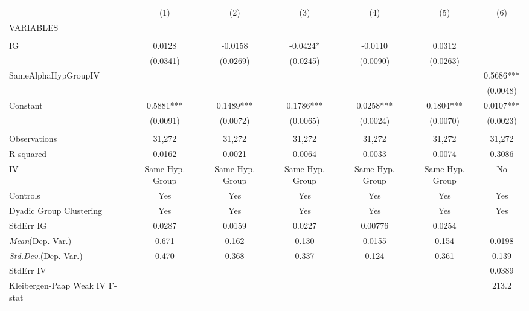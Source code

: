 \documentclass[]{article}
\begin{document}
\begin{tabular}{lcccccc} \hline
 & (1) & (2) & (3) & (4) & (5) & (6) \\
VARIABLES &  &  &  &  &  &  \\ \hline
 &  &  &  &  &  &  \\
IG & 0.0128 & -0.0158 & -0.0424* & -0.0110 & 0.0312 &  \\
 & (0.0341) & (0.0269) & (0.0245) & (0.0090) & (0.0263) &  \\
SameAlphaHypGroupIV &  &  &  &  &  & 0.5686*** \\
 &  &  &  &  &  & (0.0048) \\
Constant & 0.5881*** & 0.1489*** & 0.1786*** & 0.0258*** & 0.1804*** & 0.0107*** \\
 & (0.0091) & (0.0072) & (0.0065) & (0.0024) & (0.0070) & (0.0023) \\
 &  &  &  &  &  &  \\
Observations & 31,272 & 31,272 & 31,272 & 31,272 & 31,272 & 31,272 \\
R-squared & 0.0162 & 0.0021 & 0.0064 & 0.0033 & 0.0074 & 0.3086 \\
IV & Same Hyp. Group & Same Hyp. Group & Same Hyp. Group & Same Hyp. Group & Same Hyp. Group & No \\
Controls & Yes & Yes & Yes & Yes & Yes & Yes \\
Dyadic Group Clustering & Yes & Yes & Yes & Yes & Yes & Yes \\
StdErr IG & 0.0287 & 0.0159 & 0.0227 & 0.00776 & 0.0254 &  \\
\textit{Mean}(Dep. Var.) & 0.671 & 0.162 & 0.130 & 0.0155 & 0.154 & 0.0198 \\
\textit{Std.Dev.}(Dep. Var.) & 0.470 & 0.368 & 0.337 & 0.124 & 0.361 & 0.139 \\
StdErr IV &  &  &  &  &  & 0.0389 \\
 Kleibergen-Paap Weak IV F-stat &  &  &  &  &  & 213.2 \\ \hline
\end{tabular}
\end{document}
